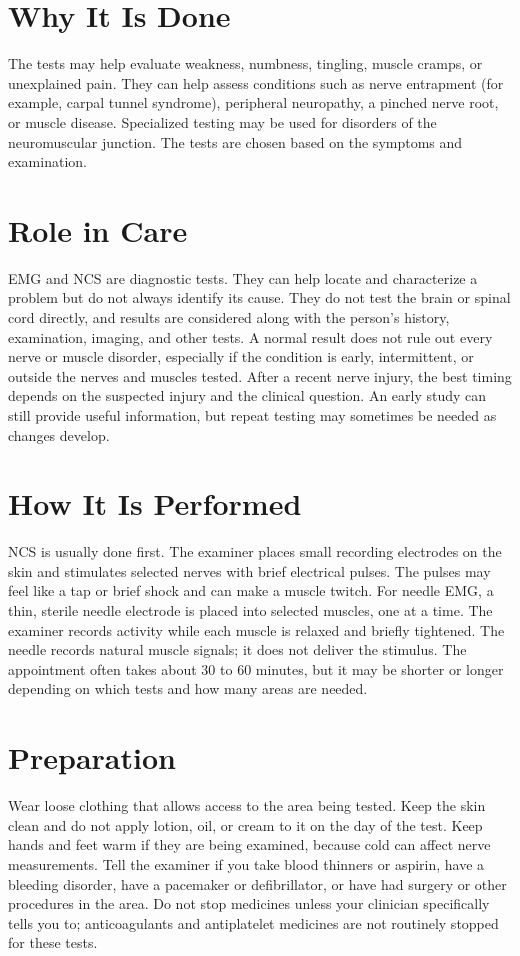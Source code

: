 \section*{Why It Is Done}
The tests may help evaluate weakness, numbness, tingling, muscle cramps, or unexplained pain. They can help assess conditions such as nerve entrapment (for example, carpal tunnel syndrome), peripheral neuropathy, a pinched nerve root, or muscle disease. Specialized testing may be used for disorders of the neuromuscular junction. The tests are chosen based on the symptoms and examination.

\section*{Role in Care}
EMG and NCS are diagnostic tests. They can help locate and characterize a problem but do not always identify its cause. They do not test the brain or spinal cord directly, and results are considered along with the person's history, examination, imaging, and other tests. A normal result does not rule out every nerve or muscle disorder, especially if the condition is early, intermittent, or outside the nerves and muscles tested. After a recent nerve injury, the best timing depends on the suspected injury and the clinical question. An early study can still provide useful information, but repeat testing may sometimes be needed as changes develop.

\section*{How It Is Performed}
NCS is usually done first. The examiner places small recording electrodes on the skin and stimulates selected nerves with brief electrical pulses. The pulses may feel like a tap or brief shock and can make a muscle twitch. For needle EMG, a thin, sterile needle electrode is placed into selected muscles, one at a time. The examiner records activity while each muscle is relaxed and briefly tightened. The needle records natural muscle signals; it does not deliver the stimulus. The appointment often takes about 30 to 60 minutes, but it may be shorter or longer depending on which tests and how many areas are needed.

\section*{Preparation}
Wear loose clothing that allows access to the area being tested. Keep the skin clean and do not apply lotion, oil, or cream to it on the day of the test. Keep hands and feet warm if they are being examined, because cold can affect nerve measurements. Tell the examiner if you take blood thinners or aspirin, have a bleeding disorder, have a pacemaker or defibrillator, or have had surgery or other procedures in the area. Do not stop medicines unless your clinician specifically tells you to; anticoagulants and antiplatelet medicines are not routinely stopped for these tests.

